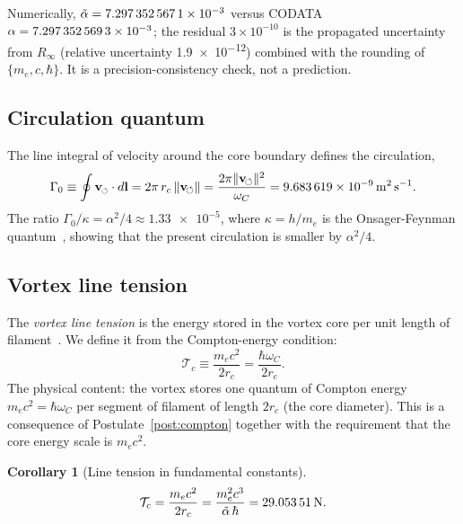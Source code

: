 \documentclass[aps,pra,preprint,longbibliography,nofootinbib]{revtex4-2}
\newtheorem{corollary}{Corollary}
\newcommand{\rotarrow}{%
  \mathchoice{\mkern-2mu\scriptstyle\boldsymbol{\circlearrowleft}}%
             {\mkern-2mu\scriptstyle\boldsymbol{\circlearrowleft}}%
             {\mkern-2mu\scriptscriptstyle\boldsymbol{\circlearrowleft}}%
             {\mkern-2mu\scriptscriptstyle\boldsymbol{\circlearrowleft}}}
\newcommand{\vc}{\mathbf{v}_{\rotarrow}}        %
\newcommand{\vnorm}{\lVert\mathbf{v}_{\!\boldsymbol{\circlearrowleft}}\rVert} %
\newcommand{\rc}{r_c}                            %
\newcommand{\omC}{\omega_C}                      %
\newcommand{\Rinf}{R_\infty}                     %
\newcommand{\Tc}{\mathcal{T}_c}                  %
\newcommand{\Gz}{\Gamma_0}                       %
\begin{document}
Numerically, $\tilde\alpha = \num{7.297\,352\,567\,1e-3}$
versus CODATA $\alpha = \num{7.297\,352\,569\,3e-3}$;
the residual $3\times10^{-10}$ is the propagated uncertainty
from $\Rinf$ (relative uncertainty \SI{1.9e-12}{}) combined with
the rounding of $\{m_e, c, \hbar\}$.
It is a precision-consistency check, not a prediction.

\subsection{Circulation quantum}
\label{sec:Gamma0}

The line integral of velocity around the core boundary defines the
circulation,
\begin{equation}
  \Gz \equiv \oint \vc\cdot d\mathbf{l}
           = 2\pi\,\rc\,\vnorm
           = \frac{2\pi\vnorm^2}{\omC}
           = \SI{9.683\,619e-9}{\meter\squared\per\second}.
  \label{eq:Gamma0}
\end{equation}
The ratio $\Gz/\kappa = \alpha^2/4 \approx \num{1.33e-5}$,
where $\kappa = h/m_e$ is the Onsager-Feynman quantum~\cite{Onsager1949,Feynman1955},
showing that the present circulation is smaller by $\alpha^2/4$.

\subsection{Vortex line tension}
\label{sec:Tc}

The \emph{vortex line tension} is the energy stored in the vortex
core per unit length of filament~\cite{Saffman1992}.
We define it from the Compton-energy condition:
\begin{equation}
  \Tc \equiv \frac{m_e c^2}{2\rc} = \frac{\hbar\omC}{2\rc}.
  \label{eq:Tc_def}
\end{equation}
The physical content: the vortex stores one quantum of Compton
energy $m_e c^2 = \hbar\omC$ per segment of filament of length
$2\rc$ (the core diameter).
This is a consequence of Postulate~\ref{post:compton} together
with the requirement that the core energy scale is $m_e c^2$.

\begin{corollary}[Line tension in fundamental constants]
\label{cor:Tc}
\begin{equation}
  \Tc = \frac{m_e c^2}{2\rc}
      = \frac{m_e^2 c^3}{\tilde\alpha\,\hbar}
      = \SI{29.053\,51}{\newton}.
  \label{eq:Tc}
\end{equation}
\end{corollary}
\end{document}
